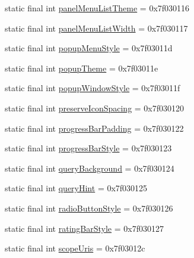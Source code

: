 \begin{DoxyCompactItemize}
\item 
static final int \mbox{\hyperlink{classcom_1_1google_1_1android_1_1gms_1_1R_1_1attr_ac60aab8eeb904a75f1fe23963153f211}{panel\+Menu\+List\+Theme}} = 0x7f030116
\item 
static final int \mbox{\hyperlink{classcom_1_1google_1_1android_1_1gms_1_1R_1_1attr_abc80eff98e124247eadb51825b134b5b}{panel\+Menu\+List\+Width}} = 0x7f030117
\item 
static final int \mbox{\hyperlink{classcom_1_1google_1_1android_1_1gms_1_1R_1_1attr_a93199ead6aa5e4d8484b6d0b8007c45a}{popup\+Menu\+Style}} = 0x7f03011d
\item 
static final int \mbox{\hyperlink{classcom_1_1google_1_1android_1_1gms_1_1R_1_1attr_aab5905dbac7d17c9333f670b6bf131b4}{popup\+Theme}} = 0x7f03011e
\item 
static final int \mbox{\hyperlink{classcom_1_1google_1_1android_1_1gms_1_1R_1_1attr_a92d964ac33c3fd65894fe23506e5de0a}{popup\+Window\+Style}} = 0x7f03011f
\item 
static final int \mbox{\hyperlink{classcom_1_1google_1_1android_1_1gms_1_1R_1_1attr_a66323a5e2db3e76d4a88c0dd005d89ee}{preserve\+Icon\+Spacing}} = 0x7f030120
\item 
static final int \mbox{\hyperlink{classcom_1_1google_1_1android_1_1gms_1_1R_1_1attr_a93ee3f4fcb51381d919e160b3106d9cd}{progress\+Bar\+Padding}} = 0x7f030122
\item 
static final int \mbox{\hyperlink{classcom_1_1google_1_1android_1_1gms_1_1R_1_1attr_a4fe843910a8004ae2dfa251ab8f1cbdb}{progress\+Bar\+Style}} = 0x7f030123
\item 
static final int \mbox{\hyperlink{classcom_1_1google_1_1android_1_1gms_1_1R_1_1attr_a7d123c5725e7192e00b18eeb5d392e0b}{query\+Background}} = 0x7f030124
\item 
static final int \mbox{\hyperlink{classcom_1_1google_1_1android_1_1gms_1_1R_1_1attr_aacc97ff52465b522e6d6ff4ead404cfd}{query\+Hint}} = 0x7f030125
\item 
static final int \mbox{\hyperlink{classcom_1_1google_1_1android_1_1gms_1_1R_1_1attr_a945f8d121bb74e3322b7beb6603bfe39}{radio\+Button\+Style}} = 0x7f030126
\item 
static final int \mbox{\hyperlink{classcom_1_1google_1_1android_1_1gms_1_1R_1_1attr_ab7a77d957b5a6dbcb605b0cd2edcc7ca}{rating\+Bar\+Style}} = 0x7f030127
\item 
static final int \mbox{\hyperlink{classcom_1_1google_1_1android_1_1gms_1_1R_1_1attr_a64d2553e5b82a217e1d82e542c7a0529}{scope\+Uris}} = 0x7f03012c

\end{DoxyCompactItemize}
